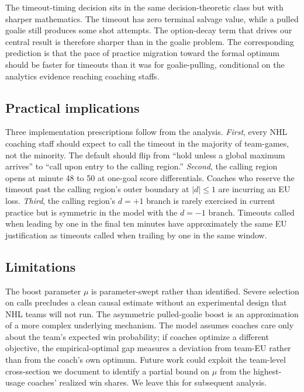 \documentclass[11pt]{article}
\begin{document}
The timeout-timing decision sits in the same decision-theoretic class but with sharper mathematics. The timeout has zero terminal salvage value, while a pulled goalie still produces some shot attempts. The option-decay term that drives our central result is therefore sharper than in the goalie problem. The corresponding prediction is that the pace of practice migration toward the formal optimum should be faster for timeouts than it was for goalie-pulling, conditional on the analytics evidence reaching coaching staffs.

\subsection{Practical implications}

Three implementation prescriptions follow from the analysis. \emph{First}, every NHL coaching staff should expect to call the timeout in the majority of team-games, not the minority. The default should flip from ``hold unless a global maximum arrives'' to ``call upon entry to the calling region.'' \emph{Second}, the calling region opens at minute 48 to 50 at one-goal score differentials. Coaches who reserve the timeout past the calling region's outer boundary at $|d| \leq 1$ are incurring an EU loss. \emph{Third}, the calling region's $d = +1$ branch is rarely exercised in current practice but is symmetric in the model with the $d = -1$ branch. Timeouts called when leading by one in the final ten minutes have approximately the same EU justification as timeouts called when trailing by one in the same window.

\subsection{Limitations}

The boost parameter $\mu$ is parameter-swept rather than identified. Severe selection on calls precludes a clean causal estimate without an experimental design that NHL teams will not run. The asymmetric pulled-goalie boost is an approximation of a more complex underlying mechanism. The model assumes coaches care only about the team's expected win probability; if coaches optimize a different objective, the empirical-optimal gap measures a deviation from team-EU rather than from the coach's own optimum. Future work could exploit the team-level cross-section we document to identify a partial bound on $\mu$ from the highest-usage coaches' realized win shares. We leave this for subsequent analysis.
\end{document}

